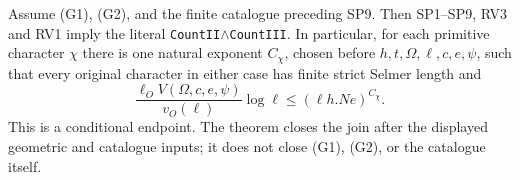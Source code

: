\begin{theorem}
\label{claim:SP10}
Assume (G1), (G2), and the finite catalogue preceding SP9.
Then SP1--SP9, RV3 and RV1 imply the literal
\texttt{CountII}$\wedge$\texttt{CountIII}.  In particular, for
each primitive character $\chi$ there is one natural exponent
$C_\chi$, chosen before $h,t,\Omega,\ell,c,e,\psi$, such that
every original character in either case has finite strict Selmer
length and
\[
 \frac{\ell_O V(\Omega,c,e,\psi)}{v_O(\ell)}\log\ell
                         \le(\ell h.N e)^{C_\chi}.
 \tag{SP.50}
\]
This is a conditional endpoint.  The theorem closes the join after
the displayed geometric and catalogue inputs; it does not close
(G1), (G2), or the catalogue itself.
\end{theorem}

